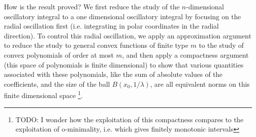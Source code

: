 
%
%

How is the result proved? We first reduce the study of the $n$-dimensional oscillatory integral to a one dimensional oscillatory integral by focusing on the radial oscillation first (i.e. integrating in polar coordinates in the radial direction). To control this radial oscillation, we apply an approximation argument to reduce the study to general convex functions of finite type $m$ to the study of convex polynomials of order at most $m$, and then apply a compactness argument (this space of polynomials is finite dimensional) to show that various quantities associated with these polynomials, like the sum of absolute values of the coefficients, and the size of the ball $B(x_0,1/\lambda)$, are all equivalent norms on this finite dimensional space \footnote{TODO: I wonder how the exploitation of this compactness compares to the exploitation of o-minimality, i.e. which gives finitely monotonic intervals}.



